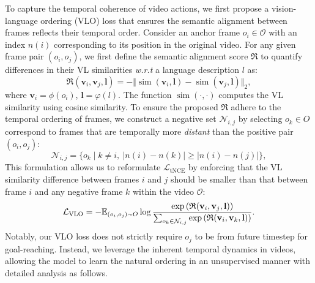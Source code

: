To capture the temporal coherence of video actions, we first propose a vision-language ordering (VLO) loss that ensures the semantic alignment between frames reflects their temporal order. Consider an anchor frame \( o_i\in\mathcal{O}\) with an index  \( n(i) \) corresponding to its position in the original video. For any given frame pair \( (o_i, o_j) \), we first define the semantic alignment score $\mathfrak{R}$ to quantify differences in their VL similarities \textit{w.r.t} a language description \( l \) as:
\begin{equation}
\mathfrak{R}(\mathbf{v}_i, \mathbf{v}_j, \mathbf{l}) = -\Vert \operatorname{sim}(\mathbf{v}_i, \mathbf{l}) - \operatorname{sim}(\mathbf{v}_j, \mathbf{l}) \Vert_2,
\end{equation}
where $\mathbf{v}_i=\phi(o_i)$, $\mathbf{l}=\varphi(l)$. The function \( \operatorname{sim}(\cdot, \cdot) \) computes the VL similarity using cosine similarity. To ensure the proposed $\mathfrak{R}$ adhere to the temporal ordering of frames, we construct a negative set $\mathcal{N}_{i, j}$ by selecting $o_k\in O$ correspond to frames that are temporally more \textit{distant} than the positive pair $(o_i, o_j)$:
\[
\mathcal{N}_{i, j} = \{ o_k \mid k \neq i, \ |n(i) - n(k)| \geq |n(i) - n(j)| \},
\]
This formulation allows us to reformulate $\mathcal{L}_{\operatorname{tNCE}}$ by enforcing that the VL similarity difference between frames $i$ and $j$ should be smaller than that between frame $i$ and any negative frame $k$ within the video $\mathcal{O}$:
\begin{equation}\small\nonumber
    \mathcal{L}_{\operatorname{VLO}}=
-\mathbb{E}_{(o_i, o_j)\sim O}
 \log \frac{\exp\left( \mathfrak{R}(\mathbf{v}_i,\mathbf{v}_j,\mathbf{l}) \right)}{\sum_{o_k \in \mathcal{N}_{i, j}} \exp \left(\mathfrak{R}(\mathbf{v}_i,\mathbf{v}_k,\mathbf{l}) \right)}.
\end{equation}
Notably, our VLO loss does not strictly require $o_j$ to be from future timestep for goal-reaching. Instead, we leverage the inherent temporal dynamics in videos, allowing the model to learn the natural ordering in an unsupervised manner with detailed analysis as follows.



